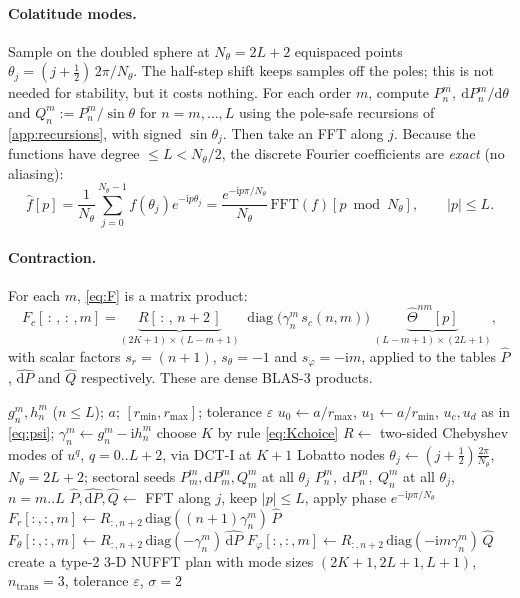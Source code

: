 \documentclass[11pt,a4paper]{article}
\theoremstyle{remark}
\newcommand{\eps}{\varepsilon}
\newcommand{\Th}{\Theta}
\begin{document}
\paragraph{Colatitude modes.} Sample on the doubled sphere at $N_\theta=2L+2$ equispaced points
$\theta_j=(j+\tfrac12)\,2\pi/N_\theta$. The half-step shift keeps samples off the poles; this is
not needed for stability, but it costs nothing. For each order $m$, compute
$P_n^m,\ \mathrm dP_n^m/\mathrm d\theta$ and $Q_n^m:=P_n^m/\sin\theta$ for $n=m,\dots,L$ using the
pole-safe recursions of \cref{app:recursions}, with signed $\sin\theta_j$. Then take an FFT
along $j$. Because the functions have degree $\le L<N_\theta/2$, the discrete Fourier
coefficients are \emph{exact} (no aliasing):
\begin{equation}
\hat f[p]=\frac{1}{N_\theta}\sum_{j=0}^{N_\theta-1}f(\theta_j)e^{-\mathrm ip\theta_j}
=\frac{e^{-\mathrm ip\pi/N_\theta}}{N_\theta}\,\mathrm{FFT}(f)[p\bmod N_\theta],\qquad |p|\le L.
\end{equation}

\paragraph{Contraction.} For each $m$, \eqref{eq:F} is a matrix product:
\begin{equation}
F_c[\,:\,,\,:\,,m]=\underbrace{R[\,:\,,\,n+2\,]}_{(2K+1)\times(L-m+1)}\;\operatorname{diag}\!\big(\gamma_n^m\,s_c(n,m)\big)\;
\underbrace{\hat\Th^{nm}[p]}_{(L-m+1)\times(2L+1)},
\end{equation}
with scalar factors $s_r=(n+1)$, $s_\theta=-1$ and $s_\varphi=-\mathrm im$, applied to the tables
$\hat P$, $\widehat{\mathrm dP}$ and $\hat Q$ respectively. These are dense BLAS-3 products.

\begin{algorithm}[t]
\caption{Precomputation (once per model and radial range)}\label{alg:pre}
\begin{algorithmic}[1]
\Require $g_n^m,h_n^m$ ($n\le L$); $a$; $[r_{\min},r_{\max}]$; tolerance $\eps$
\State $u_0\gets a/r_{\max}$, $u_1\gets a/r_{\min}$, $u_c,u_d$ as in \eqref{eq:psi}; $\gamma_n^m\gets g_n^m-\mathrm ih_n^m$
\State choose $K$ by rule \eqref{eq:Kchoice} 
\State $R\gets$ two-sided Chebyshev modes of $u^q$, $q=0..L+2$, via DCT-I at $K+1$ Lobatto nodes
\State $\theta_j\gets (j+\frac12)\frac{2\pi}{N_\theta}$, $N_\theta=2L+2$; sectoral seeds $P_m^m,\mathrm dP_m^m,Q_m^m$ at all $\theta_j$
  \State $P_n^m,\ \mathrm dP_n^m,\ Q_n^m$ at all $\theta_j$, $n=m..L$ 
  \State $\hat P,\widehat{\mathrm dP},\hat Q\gets$ FFT along $j$, keep $|p|\le L$, apply phase $e^{-\mathrm ip\pi/N_\theta}$
  \State $F_r[:,:,m]\gets R_{:,n+2}\,\mathrm{diag}((n+1)\gamma_n^m)\,\hat P$
  \State $F_\theta[:,:,m]\gets R_{:,n+2}\,\mathrm{diag}(-\gamma_n^m)\,\widehat{\mathrm dP}$
  \State $F_\varphi[:,:,m]\gets R_{:,n+2}\,\mathrm{diag}(-\mathrm im\gamma_n^m)\,\hat Q$ 
\EndFor
\State create a type-2 3-D NUFFT plan with mode sizes $(2K+1,2L+1,L+1)$, $n_{\text{trans}}=3$, tolerance $\eps$, $\sigma=2$
\end{algorithmic}
\end{algorithm}
\end{document}
